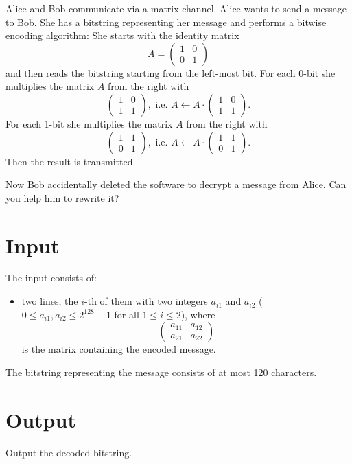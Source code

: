
Alice and Bob communicate via a matrix channel. Alice wants to send a message to Bob.  She has a bitstring representing her message and performs a bitwise encoding algorithm: She starts with the identity matrix \[A=\begin{pmatrix}1&0\\0&1\end{pmatrix}\] and then reads the bitstring starting from the left-most bit.  For each 0-bit she multiplies the matrix $A$ from the right with \[\begin{pmatrix}1&0\\1&1\end{pmatrix}\!,\text{ i.e. }A\leftarrow A\cdot \begin{pmatrix}1&0\\1&1\end{pmatrix}\!.\]  For each 1-bit she multiplies the matrix $A$ from the right with \[\begin{pmatrix}1&1\\0&1\end{pmatrix}\!,\text{ i.e. }A\leftarrow A\cdot \begin{pmatrix}1&1\\0&1\end{pmatrix}\!.\]  Then the result is transmitted. 

Now Bob accidentally deleted the software to decrypt a message from Alice. Can you help him to rewrite it?

\section*{Input}

The input consists of:
\begin{itemize}
\item two lines, the $i$-th of them with two integers $a_{i1}$ and $a_{i2}$ ($0\leq a_{i1}, a_{i2}\leq 2^{128}-1$ for all $1\leq i\leq 2$), where \[\begin{pmatrix}a_{11}&a_{12}\\a_{21}&a_{22}\end{pmatrix}\] is the matrix containing the encoded message.
\end{itemize}

The bitstring representing the message consists of at most 120 characters.

\section*{Output}
Output the decoded bitstring. 
